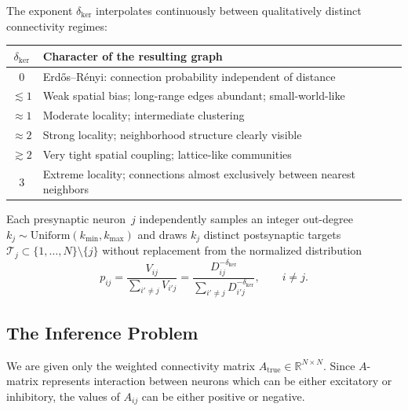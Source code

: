 \documentclass[11pt]{article}
\begin{document}
The exponent $\delta_{\mathrm{ker}}$ interpolates continuously between
qualitatively distinct connectivity regimes:

\begin{center}
\renewcommand{\arraystretch}{1.3}
\begin{tabular}{cl}
\toprule
$\delta_{\mathrm{ker}}$ & Character of the resulting graph \\
\midrule
$0$   & Erd\H{o}s--R\'enyi: connection probability independent of
        distance \\
$\lesssim 1$ & Weak spatial bias; long-range edges abundant;
        small-world-like \\
$\approx 1$  & Moderate locality; intermediate clustering \\
$\approx 2$  & Strong locality; neighborhood structure clearly visible \\
$\gtrsim 2$  & Very tight spatial coupling; lattice-like communities \\
$3$   & Extreme locality; connections almost exclusively between
        nearest neighbors \\
\bottomrule
\end{tabular}
\end{center}

\noindent
Each presynaptic neuron~$j$ independently samples an integer
out-degree $k_j\sim\mathrm{Uniform}(k_{\min},k_{\max})$ and draws
$k_j$ distinct postsynaptic targets $\mathcal{T}_j\subset
\{1,\dots,N\}\setminus\{j\}$ without replacement from the normalized
distribution
\begin{equation}
  p_{ij}
  = \frac{V_{ij}}{\displaystyle\sum_{i'\neq j}V_{i'j}}
  = \frac{D_{ij}^{-\delta_{\mathrm{ker}}}}
         {\displaystyle\sum_{i'\neq j}D_{i'j}^{-\delta_{\mathrm{ker}}}},
  \qquad i\neq j.
  \label{eq:conn_prob}
\end{equation}

\subsection{The Inference Problem}
\label{sec:inference_problem}

We are given only the weighted connectivity matrix
$A_{\mathrm{true}}\in\mathbb{R}^{N\times N}$. Since $A$-matrix represents interaction between  neurons  which can be either excitatory or inhibitory, the values of $A_{ij}$ can be either positive or negative.
\end{document}
